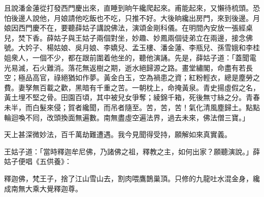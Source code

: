 且說潘金蓮從打發西門慶出來，直睡到晌午纔爬起來。甫能起來，又懶待梳頭。恐怕後邊人說他，月娘請他吃飯也不吃，只推不好。大後晌纔出房門，{}來到後邊。月娘因西門慶不在，要聽薛姑子講說佛法，演頌金剛科儀。在明間內安放一張經桌兒，焚下香。薛姑子與王姑子兩個對坐，妙趣、妙鳳兩個徒弟立在兩邊，接念佛號。大妗子、楊姑娘、吳月娘、李嬌兒、孟玉樓、潘金蓮、李瓶兒、孫雪娥和李桂姐衆人，一個不少，都在跟前圍着他坐的，聽他演誦。先是，薛姑子道：「蓋聞電光易滅，石火難消。落花無返樹之期，逝水絕歸源之路。畫堂繡閣，命盡有若長空；極品高官，祿絕猶如作夢。黃金白玉，空為禍患之資；紅粉輕衣，總是塵勞之費。妻孥無百載之歡，黑暗有千重之苦。一朝枕上，命掩黃泉。青史揚虛假之名，黃土埋不堅之骨。田園百頃，其中被兒女爭奪；綾錦千箱，死後無寸絲之分。青春未半，而白髮來侵；賀者纔聞，而吊者隨至。{}苦，苦，苦！氣化清風塵歸土。點點輪迴喚不囘，改頭換面無遍數。南無盡虛空遍法界，過去未來，佛法僧三寶。」

天上甚深微妙法，百千萬劫難遭遇。我今見聞得受持，願解如來真實義。

王姑子道：「當時釋迦牟尼佛，乃諸佛之祖，釋教之主，如何出家？願聽演說。」薛姑子便唱《五供養》：

釋迦佛，梵王子，捨了江山雪山去，割肉喂鷹鵲巢頂。只修的九龍吐水混金身，纔成南無大乘大覺釋迦尊。


